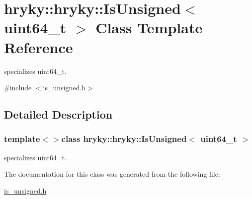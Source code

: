 \hypertarget{classhryky_1_1hryky_1_1_is_unsigned_3_01uint64__t_01_4}{\section{hryky\-:\-:hryky\-:\-:Is\-Unsigned$<$ uint64\-\_\-t $>$ Class Template Reference}
\label{classhryky_1_1hryky_1_1_is_unsigned_3_01uint64__t_01_4}
}


specializes uint64\-\_\-t.  




{\ttfamily \#include $<$is\-\_\-unsigned.\-h$>$}



\subsection{Detailed Description}
\subsubsection*{template$<$$>$class hryky\-::hryky\-::\-Is\-Unsigned$<$ uint64\-\_\-t $>$}

specializes uint64\-\_\-t. 

The documentation for this class was generated from the following file\-:\begin{DoxyCompactItemize}
\item 
\hyperlink{is__unsigned_8h}{is\-\_\-unsigned.\-h}\end{DoxyCompactItemize}
